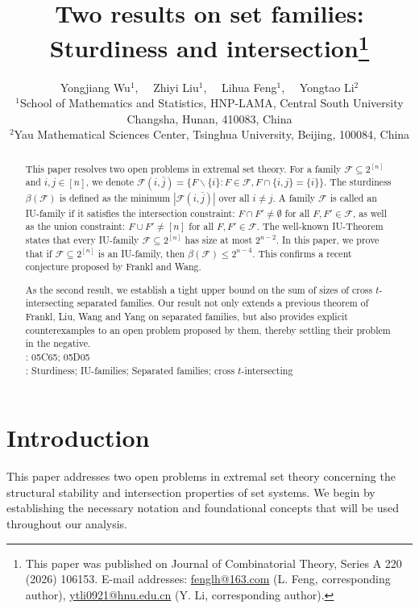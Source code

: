 \documentclass[11pt]{article}
\title{\bf \Large }
\date{ }
\title{\bf \Large 
	Two results on set families: Sturdiness and intersection\footnote{This paper was published on Journal of Combinatorial Theory, Series A 220 (2026) 106153. E-mail addresses: \url{fenglh@163.com} (L. Feng, corresponding author),
    \url{ytli0921@hnu.edu.cn} (Y. Li, corresponding author).
    }}
\author{
{\small  Yongjiang Wu$^1$, \ \  Zhiyi Liu$^1$,  \ \ Lihua Feng$^1$, \ \ Yongtao Li$^2$}\\[2mm]
\small $^1$School of Mathematics and Statistics, HNP-LAMA, Central South University\\
 \small Changsha, Hunan, 410083, China\\ 
 \small $^2$Yau Mathematical Sciences Center, Tsinghua University, Beijing, 100084, China\\
}
\begin{document}
\maketitle
\begin{abstract}
This paper resolves two open problems in extremal set theory. For a family $\mathcal{F} \subseteq 2^{[n]}$ and $i, j\in [n]$, we denote $\mathcal{F} (i,\bar{j})=\{F\backslash\{i\}:  F\in \mathcal{F}, F\cap\{i,j\}=\{i\}\}$. The sturdiness $\beta (\mathcal{F})$ is defined as the minimum $|\mathcal{F} (i,\bar{j})|$ over all $i\neq j$. A family $\mathcal{F}$ is called an IU-family if it satisfies the intersection constraint: $F\cap F'\neq \emptyset $ for all $F,F'\in \mathcal{F}$, as well as the union constraint: $F\cup F' \neq [n]$ for all $F,F'\in \mathcal{F}$. The well-known IU-Theorem states that every IU-family $\mathcal{F}\subseteq 2^{[n]}$ has size at most $ 2^{n-2}$. 
In this paper, we prove that 
if $\mathcal{F}\subseteq 2^{[n]}$ is an IU-family, then $\beta (\mathcal{F})\le 2^{n-4}$. 
This confirms a recent conjecture proposed by Frankl and Wang. 

As the second result, we establish a tight upper bound on the sum of sizes of cross $t$-intersecting separated families. Our result not only extends a previous theorem  of Frankl, Liu, Wang and Yang on separated families, 
but also provides explicit counterexamples to an open problem proposed by them, thereby settling their problem in the negative.\\



:  05C65; 05D05\\[1mm]
:  Sturdiness; IU-families; Separated families; cross $t$-intersecting
\end{abstract}

\section{Introduction}
This paper addresses two open problems in extremal set theory concerning the structural stability and intersection properties of set systems. We begin by establishing the necessary notation and foundational concepts that will be used throughout our analysis.
\end{document}
